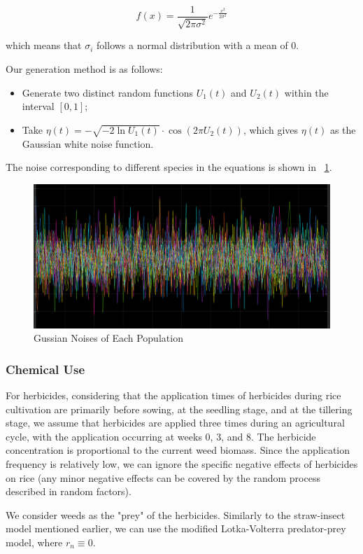 \documentclass{HZNUMCM}
\begin{document}
        \begin{equation}
        f(x) = \frac{1}{\sqrt{2\pi\sigma^2}} e^{-\frac{x^2}{2\sigma^2}}
        \end{equation}

        which means that \(\sigma_i\) follows a normal distribution with a mean of 0.
        
        Our generation method is as follows:
        \begin{itemize}
            \item Generate two distinct random functions \(U_1(t)\) and \(U_2(t)\) within the interval \([0, 1]\);
            \item Take \(\eta(t) = -\sqrt{-2 \ln U_1(t)} \cdot \cos(2\pi U_2(t))\), which gives \(\eta(t)\) as the Gaussian white noise function.
        \end{itemize}
        The noise corresponding to different species in the equations is shown in \figurename~\ref{fig:GussianNoise}.
        \begin{figure}[H]
          \centering
          \includegraphics[width=0.5\linewidth]{images/GussianNoise.png}
          \caption{Gussian Noises of Each Population}
          \label{fig:GussianNoise}
        \end{figure}
      \subsubsection{Chemical Use}
        For herbicides, considering that the application times of herbicides during rice cultivation are primarily before sowing, 
        at the seedling stage, and at the tillering stage, we assume that herbicides are applied three times during an agricultural cycle, 
        with the application occurring at weeks 0, 3, and 8. The herbicide concentration is proportional to the current weed biomass. 
        Since the application frequency is relatively low, we can ignore the specific negative effects of herbicides on rice 
        (any minor negative effects can be covered by the random process described in random factors).

        We consider weeds as the "prey" of the herbicides. 
        Similarly to the straw-insect model mentioned earlier, we can use the modified Lotka-Volterra predator-prey model, where \( r_n \equiv 0 \).
      
\end{document}
